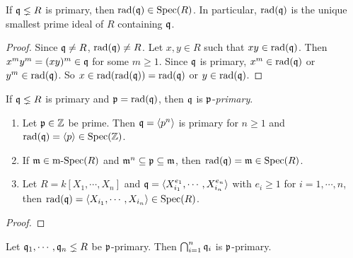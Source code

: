 \begin{proposition}
    If $\mathfrak{q} \lneq R$ is primary, then $\operatorname{rad}(\mathfrak{q}) \in \operatorname{Spec}(R)$. In particular, $\operatorname{rad}(\mathfrak{q})$ is the unique smallest prime ideal of $R$ containing $\mathfrak{q}$.
\end{proposition}

\begin{proof}
    Since $\mathfrak{q} \neq R$, $\operatorname{rad}(\mathfrak{q}) \neq R$. Let $x,y \in R$ such that $xy \in \operatorname{rad}(\mathfrak{q})$. Then $x^{m}y^{m} = (xy)^{m} \in \mathfrak{q}$ for some $m \geq 1$. Since $\mathfrak{q}$ is primary, $x^{m} \in \operatorname{rad}(\mathfrak{q})$ or $y^{m} \in \operatorname{rad}(\mathfrak{q})$. So $x \in \operatorname{rad}(\operatorname{rad}(\mathfrak{q})) = \operatorname{rad}(\mathfrak{q})$ or $y \in \operatorname{rad}(\mathfrak{q})$.
\end{proof}

\begin{definition}
    If $\mathfrak{q} \lneq R$ is primary and $\mathfrak{p} = \operatorname{rad}(\mathfrak{q})$, then $\mathfrak{q}$ is $\mathfrak{p}$-\emph{primary}.
\end{definition}

\begin{example}
    \begin{enumerate}
        \item Let $\mathfrak{p} \in \mathbb{Z}$ be prime. Then $\mathfrak{q} = \langle  p^{n} \rangle$ is primary for $n \geq 1$ and $\operatorname{rad}(\mathfrak{q}) = \langle p  \rangle \in \operatorname{Spec}(\mathbb{Z})$. 
        \item 
            If $\mathfrak{m} \in \operatorname{m-Spec}(R)$ and $\mathfrak{m}^{n} \subseteq \mathfrak{p} \subseteq \mathfrak{m}$, then $\operatorname{rad}(\mathfrak{q}) = \mathfrak{m} \in \operatorname{Spec}(R)$.
        \item Let $R = k[X_1,\cdots,X_n]$ and $\mathfrak{q} = \langle X_{i_1}^{e_{1}},\cdots,X_{i_n}^{e_{n}} \rangle$ with $e_i \geq 1$ for $i=1,\cdots,n$, then $\operatorname{rad}(\mathfrak{q}) = \langle X_{i_1},\cdots,X_{i_n} \rangle \in \operatorname{Spec}(R)$.
    \end{enumerate}
\end{example}

\begin{proof}

\end{proof}

\begin{proposition}
    Let $\mathfrak{q}_1,\cdots,\mathfrak{q}_n \lneq R$ be $\mathfrak{p}$-primary. Then $\bigcap_{i=1}^{n} \mathfrak{q}_i$ is $\mathfrak{p}$-primary.
\end{proposition}

